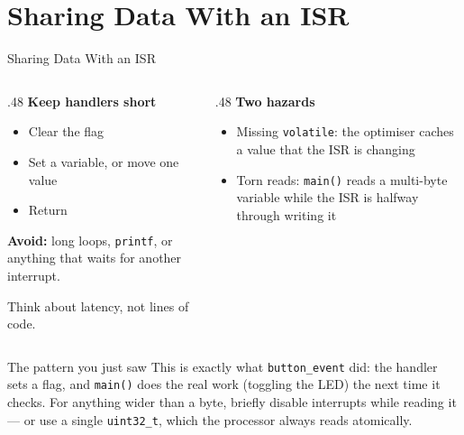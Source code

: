 \documentclass[9pt,aspectratio=169,xcolor=table]{beamer}
\begin{document}
\section{Sharing Data With an ISR}

\begin{frame}{Sharing Data With an ISR}
    \begin{columns}[T]
    \begin{column}{.48\textwidth}
        \textbf{Keep handlers short}
        {\small
        \begin{itemize}\itemsep1pt
            \item Clear the flag
            \item Set a variable, or move one value
            \item Return
        \end{itemize}}

        \vspace{2mm}
        {\small \textbf{Avoid:} long loops, \texttt{printf}, or anything
        that waits for another interrupt.}

        \vspace{2mm}
		{\small Think about latency, not lines of code.}
    \end{column}
    \begin{column}{.48\textwidth}
        \textbf{Two hazards}
        {\small
        \begin{itemize}\itemsep1pt
            \item \alert{Missing \texttt{volatile}}: the optimiser caches a
                  value that the ISR is changing
            \item \alert{Torn reads}: \texttt{main()} reads a multi-byte
                  variable while the ISR is halfway through writing it
        \end{itemize}}
    \end{column}
    \end{columns}

    \vspace{3mm}
    \begin{block}{The pattern you just saw}
        This is exactly what \texttt{button\_event} did: the handler sets
        a \alert{flag}, and \texttt{main()} does the real work (toggling
        the LED) the next time it checks. For anything wider than a byte,
        briefly disable interrupts while reading it --- or use a single
        \texttt{uint32\_t}, which the processor always reads atomically.
    \end{block}
\end{frame}
\end{document}
